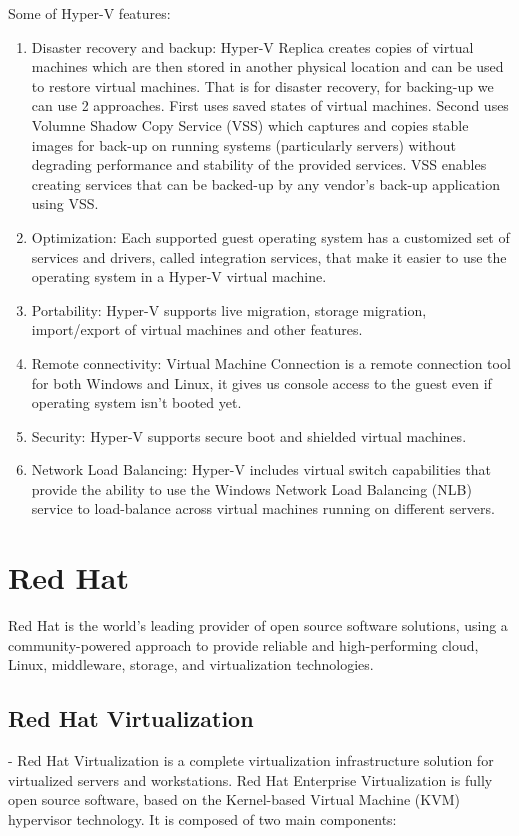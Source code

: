 Some of Hyper-V features:
\begin{enumerate}
\item Disaster recovery and backup: Hyper-V Replica creates copies of virtual machines which are then stored in another physical location and can be used to restore virtual machines. That is for disaster recovery, for backing-up we can use 2 approaches. First uses saved states of virtual machines. Second uses Volumne Shadow Copy Service (VSS) which captures and copies stable images for back-up on running systems (particularly servers) without degrading performance and stability of the provided services. VSS enables creating services that can be backed-up by any vendor's back-up application using VSS.
\item Optimization: Each supported guest operating system has a customized set of services and drivers, called integration services, that make it easier to use the operating system in a Hyper-V virtual machine.
\item Portability: Hyper-V supports live migration, storage migration, import/export of virtual machines and other features.
\item Remote connectivity: Virtual Machine Connection is a remote connection tool for both Windows and Linux, it gives us console access to the guest even if operating system isn't booted yet.
\item Security: Hyper-V supports secure boot and shielded virtual machines.
\item Network Load Balancing: Hyper-V includes virtual switch capabilities that provide the ability to use the Windows Network Load Balancing (NLB) service to load-balance across virtual machines running on different servers.
\end{enumerate}

\section{Red Hat}
Red Hat is the world’s leading provider of open source software solutions, using a community-powered approach to provide reliable and high-performing cloud, Linux, middleware, storage, and virtualization technologies.

\subsection{Red Hat Virtualization}-
Red Hat Virtualization is a complete virtualization infrastructure solution for virtualized servers and workstations. Red Hat Enterprise Virtualization is fully open source software, based on the Kernel-based Virtual Machine (KVM) hypervisor technology. It is  composed of two main components:

